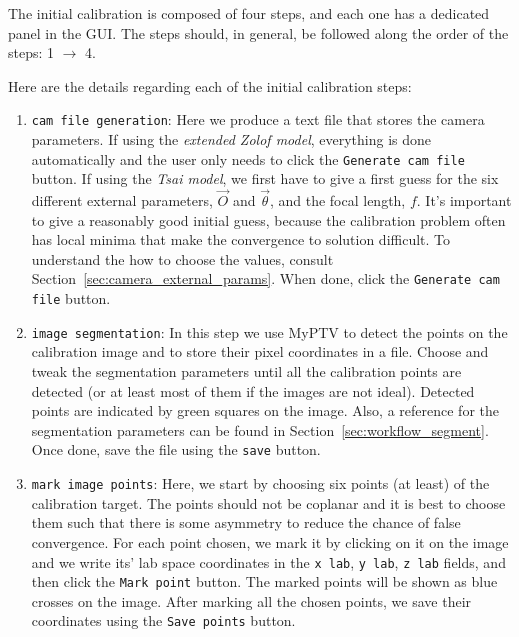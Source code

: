 \documentclass[10pt,a4paper]{article}
\begin{document}
The initial calibration is composed of four steps, and each one has a dedicated panel in the GUI. The steps should, in general, be followed along the order of the steps: 1 $\rightarrow$ 4.   


Here are the details regarding each of the initial calibration steps:

\begin{enumerate}
	\item \texttt{cam file generation}: Here we produce a text file that stores the camera parameters. If using the \textit{extended Zolof model}, everything is done automatically and the user only needs to click the \texttt{Generate cam file} button. If using the \textit{Tsai model}, we first have to give a first guess for the six different external parameters, $\vec{O}$ and $\vec{\theta}$, and the focal length, $f$. It's important to give a reasonably good initial guess, because the calibration problem often has local minima that make the convergence to solution difficult. To understand the how to choose the values, consult Section~\ref{sec:camera_external_params}. When done, click the \texttt{Generate cam file} button.  
	
	\item \texttt{image segmentation}: In this step we use MyPTV to detect the points on the calibration image and to store their pixel coordinates in a file. Choose and tweak the segmentation parameters until all the calibration points are detected (or at least most of them if the images are not ideal). Detected points are indicated by green squares on the image. Also, a reference for the segmentation parameters can be found in Section~\ref{sec:workflow_segment}. Once done, save the file using the \texttt{save} button.
	
	\item \texttt{mark image points}: Here, we start by choosing six points (at least) of the calibration target. The points should not be coplanar and it is best to choose them such that there is some asymmetry to reduce the chance of false convergence. For each point chosen, we mark it by clicking on it on the image and we write its' lab space coordinates in the \texttt{x lab}, \texttt{y lab}, \texttt{z lab} fields, and then click the \texttt{Mark point} button. The marked points will be shown as blue crosses on the image. After marking all the chosen points, we save their coordinates using the \texttt{Save points} button.
	

\end{enumerate}
\end{document}
